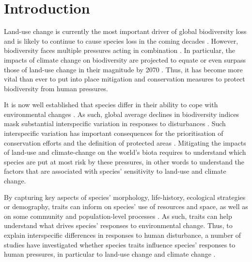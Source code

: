 \section{Introduction}
Land-use change is currently the most important driver of global biodiversity loss \citep{Newbold2015} and is likely to continue to cause species loss in the coming decades  \citep{Powers2019, Stehfest2019, Li2022}. However, biodiversity faces multiple pressures acting in combination \citep{Maxwell2016}. In particular, the impacts of climate change on biodiversity are projected to equate or  even surpass those of land-use change in their magnitude by 2070 \citep{Newbold2018}. Thus, it has become more vital than ever to put into place mitigation and conservation measures to protect biodiversity from human pressures.  

It is now well established that species differ in their ability  to cope with environmental changes \citep{Newbold2013, Matich2019, Ferreira2022}. As such, global average declines in biodiversity indices mask substantial interspecific variation in responses to disturbances \citep{Leung2020}. Such interspecific variation has important consequences for the prioritisation of conservation efforts and the definition of protected areas \citep{Morelli2021}. Mitigating the impacts of land-use and climate-change on the world's biota requires to understand which species are put at most risk by these pressures, in other words to understand the factors that are associated with species' sensitivity to land-use and climate change. 

By capturing key aspects of species' morphology, life-history, ecological strategies or demography, traits can inform on species' use of resources and space, as well as on some community and population-level processes \citep{Capdevila2022a}. As such, traits can help understand what drives species' responses to environmental change. Thus, to explain interspecific differences in responses to human disturbance, a number of studies have investigated whether species traits influence species' responses to human pressures, in particular to land-use change \citep{Newbold2013, Quesnelle2014, Nowakowski2017, Tinoco2018} and climate change \citep{Angert2011, Schloss2012, Mccain2014, Pearson2014, Pacifici2017, Estrada2018, DiMarco2021}. 


